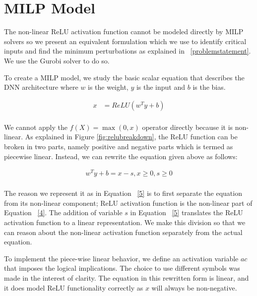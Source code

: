 
\section{MILP Model}
The non-linear ReLU activation function cannot be modeled directly by MILP solvers so we present an equivalent formulation which we use to identify critical inputs and find the minimum perturbations as explained in ~\ref{problemstatement}. 
We use the Gurobi solver to do so. 

 To create a \ac{MILP} model, we study the basic scalar equation that describes the \ac{DNN} architecture where $w$ is the weight, $y$ is the input and $b$ is the bias. 

\begin{equation}
\label{4}
\begin{aligned}
x &= ReLU(w^Ty + b) \\
\end{aligned}
\end{equation}
 

We cannot apply the $f(X) = \max(0, x)$ operator directly because it is non-linear. 
As explained in Figure \ref{fig:relubreakdown}, the ReLU function can be broken in two parts, namely positive and negative parts which is termed as piecewise linear. 
Instead, we can rewrite the equation given above as follows:

\begin{equation}
\label{5}
\begin{aligned}
w^Ty + b = x - s, x \geq 0, s \geq 0 \\
\end{aligned}
\end{equation}

The reason we represent it as in Equation ~\ref{5} is to first separate the equation from its non-linear component;  ReLU activation function is the non-linear part of Equation ~\ref{4}.
The addition of variable $s$ in Equation ~\ref{5} translates the ReLU activation function to a linear representation.
We make this division so that we can reason about the non-linear activation function separately from the actual equation. 

 To implement the piece-wise linear behavior, we define an activation variable $ac$ that imposes the logical implications. 
The choice to use different symbols was made in the interest of clarity. 
The equation in this rewritten form is linear, and it does model ReLU functionality  correctly as $x$ will always be non-negative. 

